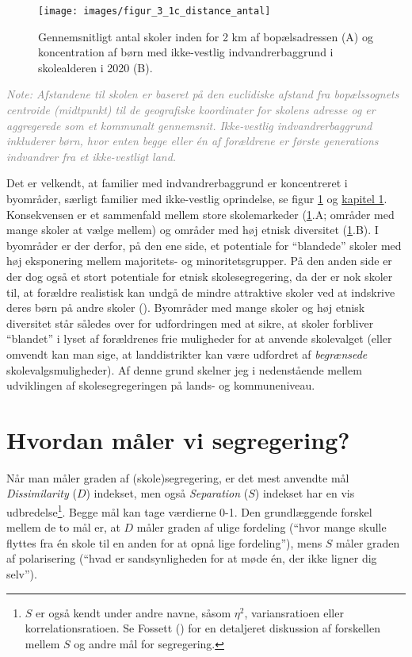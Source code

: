 \documentclass[
]{book}
\begin{document}
\begin{figure}
\texttt{[image: images/figur\_3\_1c\_distance\_antal]} \caption{Gennemsnitligt antal skoler inden for 2 km af bopælsadressen (A) og koncentration af børn med ikke-vestlig indvandrerbaggrund i skolealderen i 2020 (B).}\label{fig:fig-4-1}
\end{figure}

\begin{footnotesize}\textit{\textcolor{gray}{
Note: Afstandene til skolen er baseret på den euclidiske afstand fra bopælssognets centroide (midtpunkt) til de geografiske koordinater for skolens adresse og er aggregerede som et kommunalt gennemsnit. Ikke-vestlig indvandrerbaggrund inkluderer børn, hvor enten begge eller én af forældrene er første generations indvandrer fra et ikke-vestligt land.
}}
\end{footnotesize}

Det er velkendt, at familier med indvandrerbaggrund er koncentreret i byområder, særligt familier med ikke-vestlig oprindelse, se figur \ref{fig:fig-4-1} og \hyperref[kap1]{kapitel 1}. Konsekvensen er et sammenfald mellem store skolemarkeder (\ref{fig:fig-4-1}.A; områder med mange skoler at vælge mellem) og områder med høj etnisk diversitet (\ref{fig:fig-4-1}.B). I byområder er der derfor, på den ene side, et potentiale for ``blandede'' skoler med høj eksponering mellem majoritets- og minoritetsgrupper. På den anden side er der dog også et stort potentiale for etnisk skolesegregering, da der er nok skoler til, at forældre realistisk kan undgå de mindre attraktive skoler ved at indskrive deres børn på andre skoler (). Byområder med mange skoler og høj etnisk diversitet står således over for udfordringen med at sikre, at skoler forbliver ``blandet'' i lyset af forældrenes frie muligheder for at anvende skolevalget (eller omvendt kan man sige, at landdistrikter kan være udfordret af \emph{begrænsede} skolevalgsmuligheder). Af denne grund skelner jeg i nedenstående mellem udviklingen af skolesegregeringen på lands- og kommuneniveau.

\section{Hvordan måler vi segregering?}\label{hvordan-muxe5ler-vi-segregering}

Når man måler graden af (skole)segregering, er det mest anvendte mål \emph{Dissimilarity} (\(D\)) indekset, men også \emph{Separation} (\(S\)) indekset har en vis udbredelse\footnote{\(S\) er også kendt under andre navne, såsom \(\eta^2\), variansratioen eller korrelationsratioen. Se Fossett () for en detaljeret diskussion af forskellen mellem \(S\) og andre mål for segregering.}. Begge mål kan tage værdierne 0-1. Den grundlæggende forskel mellem de to mål er, at \(D\) måler graden af ulige fordeling (``hvor mange skulle flyttes fra én skole til en anden for at opnå lige fordeling''), mens \(S\) måler graden af polarisering (``hvad er sandsynligheden for at møde én, der ikke ligner dig selv'').
\end{document}
